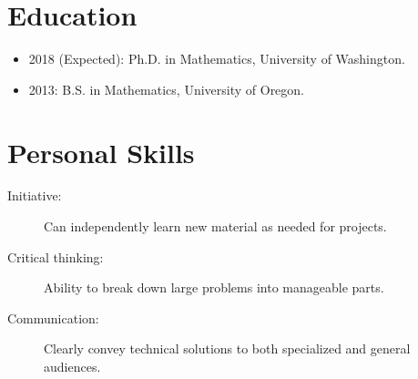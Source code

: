 \documentclass{article}
\begin{document}
	\section{Education}
	
	\begin{itemize}  
		\item 2018 (Expected): Ph.D. in Mathematics, University of Washington.
		\item 2013: B.S. in Mathematics, University of Oregon.
	\end{itemize}
	
	\section{Personal Skills}
	
	\begin{description}
		\item[Initiative:] Can independently learn new material as needed for projects.
		\item[Critical thinking:] Ability to break down large problems into manageable parts.
		\item[Communication:] Clearly convey technical solutions to both specialized and general audiences.
	\end{description}

	
\end{document}
